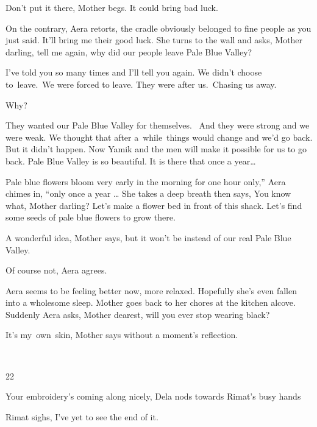 \documentclass[letterpaper]{article}
\begin{document}
{\textquotedbl}Don't put it there,{\textquotedbl} Mother begs. {\textquotedbl}It could bring bad luck.{\textquotedbl} 

{\textquotedbl}On the contrary,{\textquotedbl} Aera retorts, {\textquotedbl}the cradle obviously belonged to fine people
as you just said. It'll bring me their good luck.{\textquotedbl} She turns to the wall and asks, {\textquotedbl}Mother
darling, tell me again, why did our people leave Pale Blue Valley?{\textquotedbl} 

{\textquotedbl}I've told you so many times and I'll tell you again. We didn't choose to\ leave.\ We were forced to
leave. They were after us.\ Chasing us away.{\textquotedbl} 

{\textquotedbl}Why?{\textquotedbl} 

{\textquotedbl}They wanted our Pale Blue Valley for themselves. ~And they were strong and we were weak. We thought that
after  a\ while\ things would change and we'd go back. But it didn't happen. Now Yamik and the men will make it
possible for us to go back. Pale Blue Valley is so beautiful. It is there that once a year{\dots} {\textquotedbl} 

 {\textquotedbl}Pale blue flowers bloom very early in the morning for one hour only,'' Aera chimes in, ``only once a
year {\dots}{\textquotedbl} She takes a deep breath then says, {\textquotedbl}You know what, Mother darling? Let's make
a flower bed in front of this shack. Let's find some seeds of pale blue flowers to grow there.{\textquotedbl}

{\textquotedbl}A wonderful idea,{\textquotedbl} Mother says,{\textquotedbl} but it won't be instead of our real Pale
Blue Valley.{\textquotedbl}\ 

{\textquotedbl}Of course not,{\textquotedbl} Aera agrees.

 Aera seems to be feeling better now, more relaxed. Hopefully she's even fallen into a wholesome sleep. Mother goes back
to her chores at the kitchen alcove. Suddenly Aera asks, {\textquotedbl}Mother dearest, will you ever stop wearing
black?{\textquotedbl} 

{\textquotedbl}It's my\textcolor{red}{\ }own\ skin,{\textquotedbl} Mother says without a moment's reflection. 

~

22~~

{\textquotedbl}Your embroidery's coming along nicely,{\textquotedbl} Dela nods towards Rimat's busy hands

Rimat sighs, {\textquotedbl}I've yet to see the end of it.{\textquotedbl} 
\end{document}
